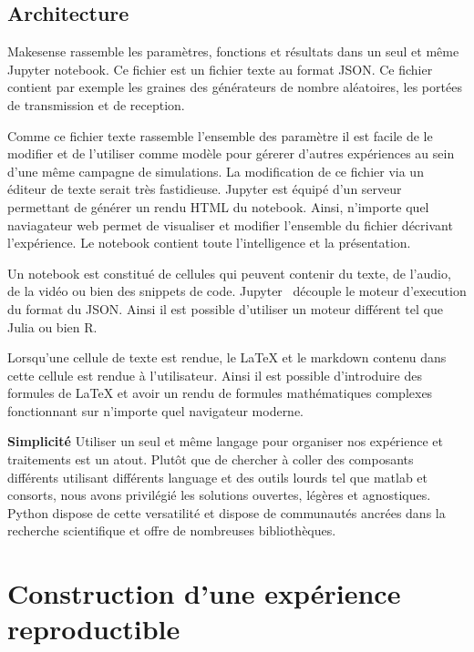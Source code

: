
\subsection{Architecture} %
\label{sub:architecture}

Makesense rassemble les paramètres, fonctions et résultats dans un seul et
même Jupyter notebook. Ce fichier est un fichier texte au format \ac{JSON}. Ce
fichier contient par exemple les graines des générateurs de nombre aléatoires, 
les portées de transmission et de reception.

Comme ce fichier texte rassemble l'ensemble des paramètre il est facile de le
modifier et de l'utiliser comme modèle pour gérerer d'autres expériences au
sein d'une même campagne de simulations. La modification de ce fichier via un
éditeur de texte serait très fastidieuse. Jupyter est équipé d'un serveur
permettant de générer un rendu HTML du notebook. Ainsi, n'importe quel
naviagateur web permet de visualiser et modifier l'ensemble du fichier
décrivant l'expérience. Le notebook contient toute l'intelligence et la
présentation.

Un notebook est constitué de cellules qui peuvent contenir du texte, de
l'audio, de la vidéo ou bien des snippets de code. Jupyter~\cite{PER-GRA:2007}
découple le moteur d'execution du format du JSON. Ainsi il est possible
d'utiliser un moteur différent tel que Julia ou bien R.

Lorsqu'une cellule de texte est rendue, le \LaTeX{} et le markdown contenu  dans
cette cellule est rendue à l'utilisateur. Ainsi il est possible d'introduire
des formules de \LaTeX{} et avoir un rendu de formules mathématiques complexes
fonctionnant sur n'importe quel navigateur moderne.

\textbf{Simplicité} Utiliser un seul et même langage pour organiser nos
expérience et traitements est un atout. Plutôt que de chercher à coller des
composants différents utilisant différents language et des outils lourds tel
que matlab et consorts, nous avons privilégié les solutions ouvertes, légères
et agnostiques. Python dispose de cette versatilité et dispose de communautés
ancrées dans la recherche scientifique et offre de nombreuses bibliothèques.

\section{Construction d'une expérience reproductible} %
\label{sub:steps}

